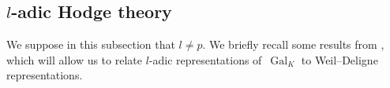 \documentclass{amsart}
\renewcommand{\mathbb}{\mathbf}
\theoremstyle{definition}
\theoremstyle{remark}
\newcommand{\mar}[1]{}
\newcommand{\mar}[1]{\marginpar{\raggedright\tiny squirrel #1}}
\newcommand{\Q}{\QQ}
\newcommand{\Z}{\ZZ}
\newcommand{\QQ}{{\mathbb Q}}
\newcommand{\ZZ}{{\mathbb Z}}
\DeclareMathOperator{\Aut}{Aut}
\DeclareMathOperator{\End}{End}
\DeclareMathOperator{\Gal}{Gal}
\DeclareMathOperator{\GL}{GL}
\begin{document}
\subsection{$l$-adic Hodge theory}\label{subsec: l not p Galois to
  WD}We suppose in this subsection that $l\ne p$. We briefly recall some
results from \cite{fonl}, which will allow us to relate $l$-adic
representations of~$\Gal_K$ to Weil--Deligne representations. %

\end{document}
